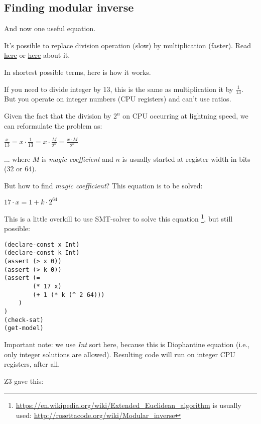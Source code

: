 \subsection{Finding modular inverse}

And now one useful equation.

It's possible to replace division operation (slow) by multiplication (faster).
Read \href{http://beginners.re/15-Nov-2015/Reverse_Engineering_for_Beginners-en.pdf#page=490&zoom=auto,-107,806}{here} or \href{http://yurichev.com/blog/modulo/}{here} about it.

In shortest possible terms, here is how it works.

If you need to divide integer by 13, this is the same as multiplication it by $\frac{1}{13}$.
But you operate on integer numbers (\ac{CPU} registers) and can't use ratios.

Given the fact that the division by $2^n$ on \ac{CPU} occurring at lightning speed, we can reformulate the problem as:

\begin{center}
{\Large $\frac{x}{13} = x \cdot \frac{1}{13} = x \cdot \frac{M}{2^n} = \frac{x \cdot M}{2^n}$ }
\end{center}

... where $M$ is \textit{magic coefficient} and $n$ is usually started at register width in bits (32 or 64).

But how to find \textit{magic coefficient}?
This equation is to be solved:

\begin{center}
{\Large $17 \cdot x = 1+k \cdot 2^{64}$ }
\end{center}

This is a little overkill to use \ac{SMT}-solver to solve this equation
\footnote{\url{https://en.wikipedia.org/wiki/Extended_Euclidean_algorithm} is usually used:
\url{http://rosettacode.org/wiki/Modular\_inverse}}, but still possible:

\begin{lstlisting}
(declare-const x Int)
(declare-const k Int)
(assert (> x 0))
(assert (> k 0))
(assert (=
		(* 17 x)
		(+ 1 (* k (^ 2 64)))
	)
)
(check-sat)
(get-model)
\end{lstlisting}

Important note: we use \textit{Int} sort here, because this is Diophantine equation (i.e., only integer solutions are allowed).
Resulting code will run on integer \ac{CPU} registers, after all.

Z3 gave this:

